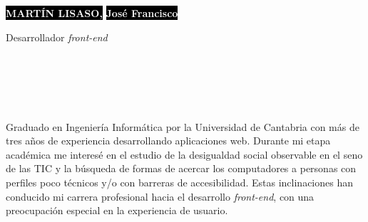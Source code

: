\documentclass[9pt]{developercv} %
\begin{document}
%
%

\begin{minipage}[t]{0.6\textwidth}
	\vspace{-\baselineskip} %

	\colorbox{black}{{\HUGE\textcolor{white}{\textbf{\MakeUppercase{Martín Lisaso,}}}}}
	\colorbox{black}{{\HUGE\textcolor{white}{\textbf{José Francisco}}}}

	\vspace{6pt}

	{\huge Desarrollador \emph{front-end}}
\end{minipage}
\hfill
\begin{minipage}[t]{0.3\textwidth}
	\vspace{-\baselineskip} %

	\\
	\\
	\\
	\\
\end{minipage}

\vspace{0.5cm}

%
%


\begin{minipage}[t]{0.45\textwidth} %
	\vspace{-\baselineskip} %
	
	Graduado en Ingeniería Informática por la Universidad de Cantabria con más de tres años de experiencia desarrollando aplicaciones web. Durante mi etapa académica me interesé en el estudio de la desigualdad social observable en el seno de las TIC y la búsqueda de formas de acercar los computadores a personas con perfiles poco técnicos y/o con barreras de accesibilidad. Estas inclinaciones han conducido mi carrera profesional hacia el desarrollo \emph{front-end}, con una preocupación especial en la experiencia de usuario.\\
\end{minipage}
\hfill %
\begin{minipage}[t]{0.5\textwidth} %
	\vspace{-\baselineskip} %
	\begin{barchart}{5.5}
	\end{barchart}
\end{minipage}
\end{document}
